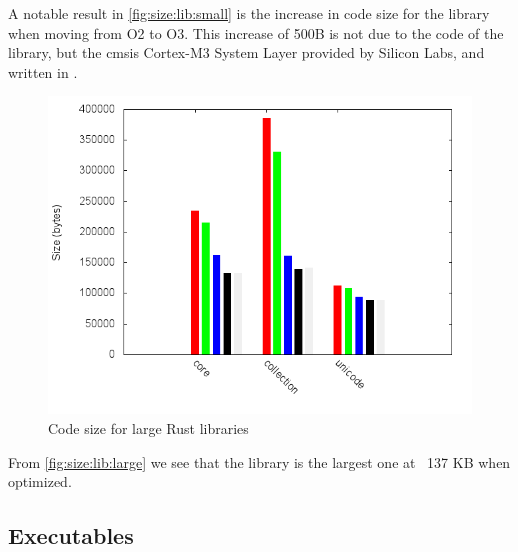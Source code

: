 A notable result in \autoref{fig:size:lib:small} is the increase in code size for the  library when moving from O2 to O3.
This increase of 500B is not due to the {\rust} code of the  library, but the \gls{cmsis} Cortex-M3 System Layer provided by Silicon Labs, and written in {\C}.

\begin{figure}[H]
  \begin{center}
    \includegraphics[scale=0.5]{results/plots/size/lib/large/size.png}
  \end{center}
  \caption{Code size for large Rust libraries}
  \label{fig:size:lib:large}
\end{figure}

From \autoref{fig:size:lib:large} we see that the  library is the largest one at ~137 KB when optimized.


\subsection{Executables}

